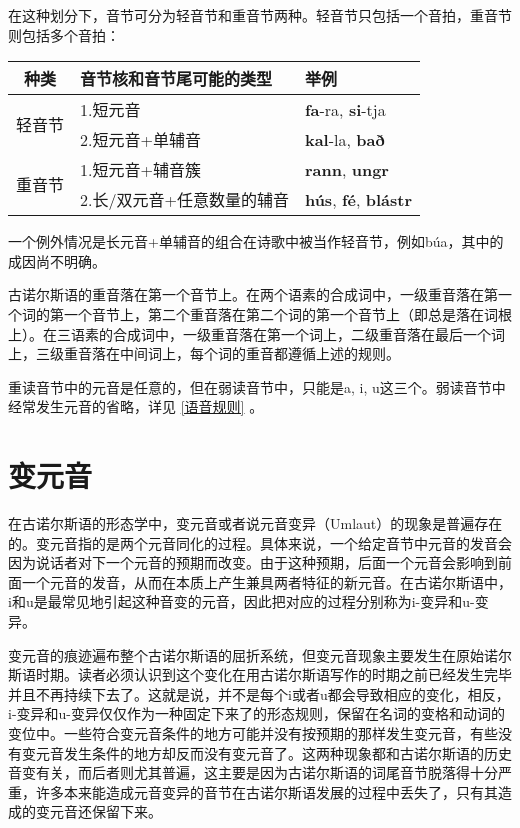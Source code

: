 在这种划分下，音节可分为轻音节和重音节两种。轻音节只包括一个音拍，重音节则包括多个音拍：


\begin{table}[H]
  \centering
  \begin{tabular}{cll}
    \hline
    \textbf{种类}          & \textbf{音节核和音节尾可能的类型} & \textbf{举例}                                 \\ \hline
    \multirow{2}{*}{轻音节} & 1.短元音                 & \textbf{fa}-ra, \textbf{si}-tja             \\
                         & 2.短元音+单辅音             & \textbf{kal}-la, \textbf{bað}               \\[1ex]
    \multirow{2}{*}{重音节} & 1.短元音+辅音簇             & \textbf{rann}, \textbf{ungr}                \\
                         & 2.长/双元音+任意数量的辅音       & \textbf{hús}, \textbf{fé},  \textbf{blástr} \\ \hline
  \end{tabular}
\end{table}

一个例外情况是长元音+单辅音的组合在诗歌中被当作轻音节，例如búa，其中的成因尚不明确。

古诺尔斯语的重音落在第一个音节上。在两个语素的合成词中，一级重音落在第一个词的第一个音节上，第二个重音落在第二个词的第一个音节上（即总是落在词根上）。在三语素的合成词中，一级重音落在第一个词上，二级重音落在最后一个词上，三级重音落在中间词上，每个词的重音都遵循上述的规则。

重读音节中的元音是任意的，但在弱读音节中，只能是a, i, u这三个。弱读音节中经常发生元音的省略，详见 \ref{语音规则} 。

\section{变元音}
\label{变元音}

在古诺尔斯语的形态学中，变元音或者说元音变异（Umlaut）的现象是普遍存在的。变元音指的是两个元音同化的过程。具体来说，一个给定音节中元音的发音会因为说话者对下一个元音的预期而改变。由于这种预期，后面一个元音会影响到前面一个元音的发音，从而在本质上产生兼具两者特征的新元音。在古诺尔斯语中，i和u是最常见地引起这种音变的元音，因此把对应的过程分别称为i-变异和u-变异。

变元音的痕迹遍布整个古诺尔斯语的屈折系统，但变元音现象主要发生在原始诺尔斯语时期。读者必须认识到这个变化在用古诺尔斯语写作的时期之前已经发生完毕并且不再持续下去了。这就是说，并不是每个i或者u都会导致相应的变化，相反，i-变异和u-变异仅仅作为一种固定下来了的形态规则，保留在\textbf{}名词的变格和动词的变位中。一些符合变元音条件的地方可能并没有按预期的那样发生变元音，有些没有变元音发生条件的地方却反而没有变元音了。这两种现象都和古诺尔斯语的历史音变有关，而后者则尤其普遍，这主要是因为古诺尔斯语的词尾音节脱落得十分严重，许多本来能造成元音变异的音节在古诺尔斯语发展的过程中丢失了，只有其造成的变元音还保留下来。

